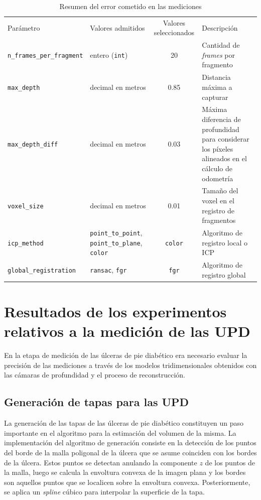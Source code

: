 \begin{table}[ht]
	\centering
	\begin{tabular}{lp{2.5cm}cp{4cm}}
		\hhline{====}
		Parámetro & Valores admitidos & Valores seleccionados & Descripción\\
		\hhline{====}
		\verb|n_frames_per_fragment| & entero (\verb|int|) & 20 & Cantidad de \textit{frames} por fragmento\\ \hline
		\verb|max_depth| & decimal en metros & 0.85 & Distancia máxima a capturar\\ \hline
		\verb|max_depth_diff| & decimal en metros & 0.03 & Máxima diferencia de profundidad para considerar los píxeles alineados en el cálculo de odometría\\ \hline
		\verb|voxel_size| & decimal en metros & 0.01 & Tamaño del voxel en el registro de fragmentos \\ \hline
		\verb|icp_method| & \verb|point_to_point|, \verb|point_to_plane|, \verb|color| & \verb|color| & Algoritmo de registro local o ICP\\ \hline
		\verb|global_registration| & \verb|ransac|, \verb|fgr| & \verb|fgr| & Algoritmo de registro global \\ \hline
	\end{tabular}
	\caption{Resumen del error cometido en las mediciones}
	\label{tab:params}
\end{table}

\section{Resultados de los experimentos relativos a la medición de las UPD}

En la etapa de medición de las úlceras de pie diabético era necesario evaluar la precisión de las mediciones a través de los modelos tridimensionales obtenidos con las cámaras de profundidad y el proceso de reconstrucción. 

\subsection{Generación de tapas para las UPD}

La generación de las tapas de las úlceras de pie diabético constituyen un paso importante en el algoritmo para la estimación del volumen de la misma. La implementación del algoritmo de generación consiste en la detección de los puntos del borde de la malla poligonal de la úlcera que se asume coinciden con los bordes de la úlcera. Estos puntos se detectan anulando la componente $z$ de los puntos de la malla, luego se calcula la envoltura convexa de la imagen plana y los bordes son aquellos puntos que se localicen sobre la envoltura convexa. Posteriormente, se aplica un \textit{spline} cúbico para interpolar la superficie de la tapa.

